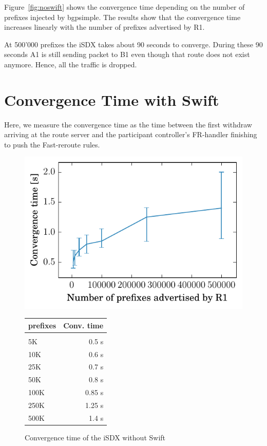 Figure~\ref{fig:noswift} shows the convergence time depending on the number of prefixes injected by bgpsimple. The results show that the convergence time increases linearly with the number of prefixes advertised by R1.

At 500'000 prefixes the iSDX takes about 90 seconds to converge. During these 90 seconds A1 is still sending packet to B1 even though that route does not exist anymore. Hence, all the traffic is dropped. 

\section{\label{chapter5:Convergence time with Swift}Convergence Time with Swift}

Here, we measure the convergence time as the time between the first withdraw arriving at the route server and the participant controller's FR-handler finishing to push the Fast-reroute rules.

\begin{figure}[h]
\centering
\begin{minipage}[t]{.4\textwidth}
\centering
\vspace{0pt}
\includegraphics[scale = 1]{Figures/swift.pdf}
\end{minipage}\hfill
\begin{minipage}[t]{.4\textwidth}
\centering
\vspace{0pt}
\begin{tabular}{@{}lr@{}}
	\\
	prefixes & Conv. time \\
	\hline
	\\
    5K & 0.5 s  \\
    10K & 0.6 s   \\
    25K & 0.7 s   \\
    50K & 0.8 s  \\
    100K & 0.85 s \\
    250K & 1.25 s   \\
    500K & 1.4 s  \\
\end{tabular}
\end{minipage}
\caption{Convergence time of the iSDX without Swift}
\label{fig:withswift}
\end{figure}

